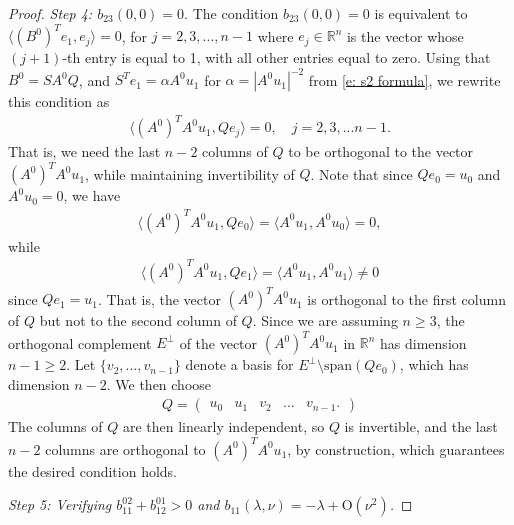 \documentclass[11pt]{article}
\newcommand{\R}{\mathbb{R}}
\newcommand{\spn}{\text{\span}}
\numberwithin{equation}{section}
\numberwithin{prop}{section}
\renewcommand{\spn}{\mathrm{span}}
\newcommand{\bigo}{\mathrm{O}}
\begin{document}
\begin{proof}
	\emph{Step 4: $b_{23}(0,0) = 0$}. The condition $b_{23}(0,0) = 0$ is equivalent to $\langle (B^0)^T e_1, e_j \rangle = 0$, for $j = 2, 3, ..., n-1$ where $e_j \in \R^n$ is the vector whose $(j+1)$-th entry is equal to 1, with all other entries equal to zero. Using that $B^0 = S A^0 Q$, and $S^T e_1 = \alpha A^0 u_1$ for $\alpha = |A^0 u_1|^{-2}$ from \eqref{e: s2 formula}, we rewrite this condition as 
	\begin{align}
	\langle (A^0)^T A^0 u_1, Q e_j \rangle = 0, \quad j = 2, 3, ... n-1. \label{e: normal form li step 4}
	\end{align}
	That is, we need the last $n-2$ columns of $Q$ to be orthogonal to the vector $(A^0)^T A^0 u_1$, while maintaining invertibility of $Q$. Note that since $Q e_0 = u_0$ and $A^0 u_0 = 0$, we have
	\begin{align*}
	\langle (A^0)^T A^0 u_1, Q e_0 \rangle = \langle A^0 u_1, A^0 u_0 \rangle = 0,
	\end{align*}
	while
	\begin{align*}
	\langle (A^0)^T A^0 u_1, Q e_1 \rangle = \langle A^0 u_1, A^0 u_1 \rangle \neq 0
	\end{align*}
	since $Q e_1 = u_1$. That is, the vector $(A^0)^T A^0 u_1$ is orthogonal to the first column of $Q$ but not to the second column of $Q$. Since we are assuming $n \geq 3$, the orthogonal complement $E^\perp$ of the vector $(A^0)^T A^0 u_1$ in $\R^n$ has dimension $n-1 \geq 2$. Let $\{ v_2, ..., v_{n-1}\}$ denote a basis for $E^\perp \setminus \spn (Q e_0)$, which has dimension $n-2$. We then choose
	\begin{align}
	Q = \begin{pmatrix} 
	u_0 & u_1 & v_2 & ... & v_{n-1}.
	\end{pmatrix}
	\end{align}
	The columns of $Q$ are then linearly independent, so $Q$ is invertible, and the last $n-2$ columns are orthogonal to $(A^0)^T A^0 u_1$, by construction, which guarantees the desired condition holds. 
	
	
	\emph{Step 5: Verifying $b_{11}^{02} + b_{12}^{01} > 0$ and $b_{11}(\lambda, \nu) = -\lambda+ \bigo(\nu^2)$.} 
	

\end{proof}
\end{document}
